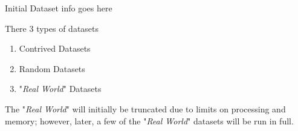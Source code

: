 \documentclass[../../ClusteringConnectionsMAIN.tex]{subfiles}
\begin{document}
\begin{flushleft}
\begin{large}

Initial Dataset info goes here \newline

There 3 types of datasets

\begin{enumerate}
\item Contrived Datasets
\item Random Datasets
\item "\emph{Real World}" Datasets
\end{enumerate}

The "\emph{Real World}" will initially be truncated due to limits on processing and memory; however, later, a few of the "\emph{Real World}" datasets will be run in full.

\end{large}
\end{flushleft}
\end{document}
